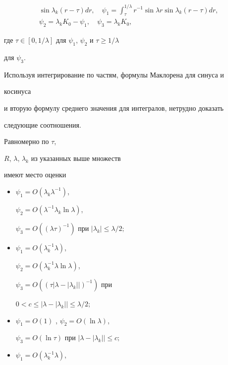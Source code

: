 {\begin{gather*}
\sin\lambda_k(r-\tau)dr,\quad


\psi_1=\int^{1/\lambda}_\tau r^{-1}\sin\lambda r


\sin\lambda_k(r-\tau)dr,\\


\psi_2=\lambda_k K_0-\psi_1, \quad \psi_3=\lambda_k K_0,


\end{gather*}


где $\tau\in[0,1/\lambda]$ для $\psi_1$, $\psi_2$ и $\tau\ge 1/\lambda$


для $\psi_3$.


Используя интегрирование по частям, формулы Маклорена для синуса и


косинуса


и вторую формулу среднего значения для интегралов, нетрудно доказать


следующие соотношения.





\begin{lem}


Равномерно по $\tau$,


$R$, $\lambda$, $\lambda_k$ из указанных выше множеств


имеют место оценки


\begin{itemize}


\item[а)] $\psi_1=O(\lambda_k\lambda^{-1})$,


$\psi_2=O(\lambda^{-1}\lambda_k\ln\lambda)$,


$\psi_3=O((\lambda\tau)^{-1})$ при $|\lambda_k|\le\lambda/2;$


\item[б)] $\psi_1=O(\lambda^{-1}_k\lambda)$,


$\psi_2=O(\lambda^{-1}_k\lambda\ln\lambda)$,


$\psi_3=O((\tau\bigl|\lambda-|\lambda_k|\bigr|)^{-1})$ при


$0<c\le\bigl|\lambda-|\lambda_k|\bigr|\le\lambda/2;$


\item[в)] $\psi_1=O(1)$ , $\psi_2=O(\ln\lambda)$,


$\psi_3=O(\ln\tau)$ при $\bigl|\lambda-|\lambda_k|\bigr|\le c;$


\item[г)] $\psi_1=O(\lambda^{-1}_k\lambda)$,



\end{itemize}
\end{lem}}
